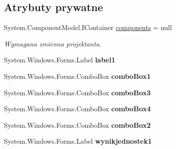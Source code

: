 \subsection*{Atrybuty prywatne}
\begin{DoxyCompactItemize}
\item 
System.\+Component\+Model.\+I\+Container \mbox{\hyperlink{classkalku__all__in__one_1_1_jednostki____i__miary_a7b1e52b4fd88b5cbd75f4e288e12291f}{components}} = null
\begin{DoxyCompactList}\small\item\em Wymagana zmienna projektanta. \end{DoxyCompactList}\item 
\mbox{\label{classkalku__all__in__one_1_1_jednostki____i__miary_a9d23327bc0733d798ad1cc9974ec0458}} 
System.\+Windows.\+Forms.\+Label {\bfseries label1}
\item 
\mbox{\label{classkalku__all__in__one_1_1_jednostki____i__miary_a969eb361962194332589c64190764255}} 
System.\+Windows.\+Forms.\+Combo\+Box {\bfseries combo\+Box1}
\item 
\mbox{\label{classkalku__all__in__one_1_1_jednostki____i__miary_ad3350534ac77dea183ee2bae885992e3}} 
System.\+Windows.\+Forms.\+Combo\+Box {\bfseries combo\+Box3}
\item 
\mbox{\label{classkalku__all__in__one_1_1_jednostki____i__miary_a9382db098b6ef8603a2fd667a329dc6d}} 
System.\+Windows.\+Forms.\+Combo\+Box {\bfseries combo\+Box4}
\item 
\mbox{\label{classkalku__all__in__one_1_1_jednostki____i__miary_a66b9226b1812f99242c87f71f9f0418c}} 
System.\+Windows.\+Forms.\+Combo\+Box {\bfseries combo\+Box2}
\item 
\mbox{\label{classkalku__all__in__one_1_1_jednostki____i__miary_a2bc791f844d4655459c7657a26c75fdf}} 
System.\+Windows.\+Forms.\+Label {\bfseries wynikjednostek1}
\item 
\mbox{\label{classkalku__all__in__one_1_1_jednostki____i__miary_ace298d6bf194994a0eb6e9b3a7efcdde}} 

\end{DoxyCompactItemize}

